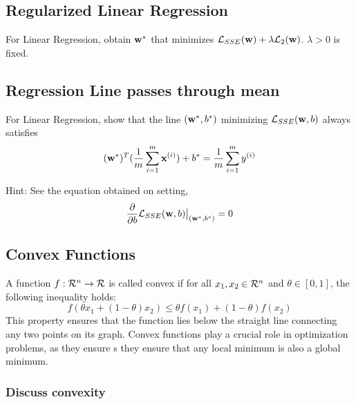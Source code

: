 \subsection{Regularized Linear Regression}
For Linear Regression, obtain $\wb^{*}$ that minimizes $\loss_{SSE}(\wb) + \lambda \loss_2(\wb)$. $\lambda > 0$ is fixed.

\subsection{Regression Line passes through mean}
For Linear Regression, show that the line $(\wb^{*}, b^{*})$ minimizing $\loss_{SSE}(\wb, b)$ always satisfies
\begin{equation*}    
(\wb^{*})^T(\frac{1}{m} \sum_{i = 1}^{m} \xieg) + b^{*} =  \frac{1}{m} \sum_{i = 1}^{m} \yieg
\end{equation*}

Hint: See the equation obtained on setting,
\begin{equation*}
    \frac{\partial }{\partial b}\loss_{SSE}(\wb, b)\at[\big]{(\wb^*, b^*)} = 0
\end{equation*}


\subsection{Convex Functions}\label{def:convexity}

A function \( f: \re^n \rightarrow \re \) is called convex if for all \( x_1, x_2 \in \re^n \) and \( \theta \in [0, 1] \), the following inequality holds:
\[
f(\theta x_1 + (1-\theta) x_2) \leq \theta f(x_1) + (1-\theta) f(x_2)
\]
This property ensures that the function lies below the straight line connecting any two points on its graph. Convex functions play a crucial role in optimization problems, as they ensure s they ensure that any local minimum is also a global minimum.

\vspace{0.5cm}
\subsubsection{Discuss convexity}

